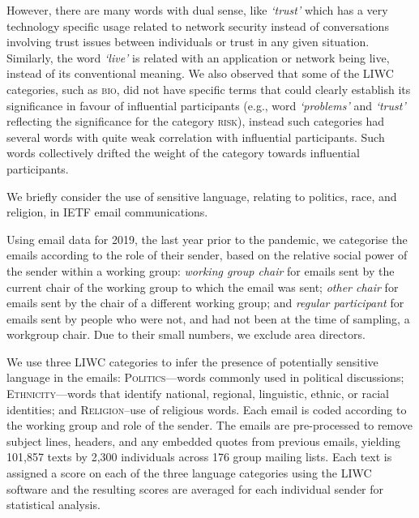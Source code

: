 \documentclass[twocolumn,10pt]{article}
\newcommand{\pb}[1]{\vspace{0.75ex}\noindent{\textbf{#1}}}
\newcommand{\liwc}[1]{\textsc{#1}}
\newcommand{\word}[1]{\textit{`#1'}}
\begin{document}
However, there are many words with dual sense, like \word{trust} which has
a very technology specific usage related to network security instead of
conversations involving trust issues between individuals or trust in any
given situation. Similarly, the word \word{live} is related with an
application or network being live, instead of its conventional meaning. We
also observed that some of the LIWC categories, such as \liwc{bio}, did not
have specific terms that could clearly establish its significance in favour
of influential participants (e.g., word \word{problems} and \word{trust}
reflecting the significance for the category \liwc{risk}), instead such
categories had several words with quite weak correlation with influential
participants. Such words collectively drifted the weight of the category
towards influential participants.


\pb{Use of Sensitive Language:}
We briefly consider the use of sensitive language, relating to politics,
race, and religion, in IETF email communications.

Using email data for 2019, the last year prior to the pandemic, we
categorise the emails according to the role of their sender, based
on the relative social power of the sender within a working group:
\emph{working group chair} for emails sent by the current chair of the
working group to which the email was sent;
\emph{other chair} for emails sent by the chair of a different working
group; and
\emph{regular participant} for emails sent by people who were not, and had
not been at the time of sampling, a workgroup chair.
Due to their small numbers, we exclude area directors.

We use three LIWC categories to infer the presence of potentially sensitive
language in the emails: 
\liwc{Politics}---words commonly used in political discussions;
\liwc{Ethnicity}---words that identify national, regional, linguistic,
  ethnic, or racial identities; and
\liwc{Religion}--use of religious words.
Each email is coded according to the working group and role of the sender.
The emails are pre-processed to remove subject lines, headers, and any
embedded quotes from previous emails, yielding 101,857 texts by 2,300
individuals across 176 group mailing lists.  Each text is assigned a score
on each of the three language categories using the LIWC software and the
resulting scores are averaged for each individual sender for statistical
analysis.
\end{document}

